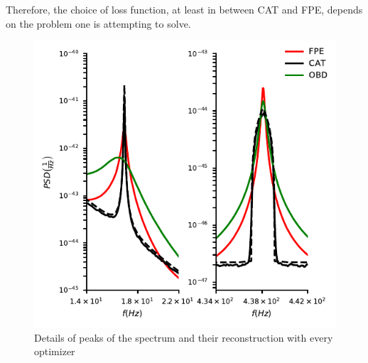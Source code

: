 \documentclass[twocolumn,showpacs,preprintnumbers,nofootinbib,prd,
superscriptaddress,10pt]{revtex4-1}
\begin{document}
Therefore, the choice of loss function, at least in between CAT and FPE, depends on the problem one  is attempting to solve.
\begin{figure}[t]
        \includegraphics[width = \linewidth]{Images/optimisers_comparison/ligo/compare_estimates_peaks.pdf}
        \caption{Details of peaks of the spectrum and their reconstruction with every optimizer}
        \label{fig:ligoPeaks}
\end{figure}
\end{document}
